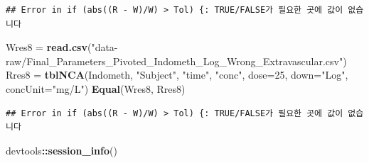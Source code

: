 \documentclass[12pt,]{krantz}
\newenvironment{Shaded}{\begin{snugshade}}{\end{snugshade}}
\newcommand{\DataTypeTok}[1]{\textcolor[rgb]{0.13,0.29,0.53}{#1}}
\newcommand{\DecValTok}[1]{\textcolor[rgb]{0.00,0.00,0.81}{#1}}
\newcommand{\KeywordTok}[1]{\textcolor[rgb]{0.13,0.29,0.53}{\textbf{#1}}}
\newcommand{\NormalTok}[1]{#1}
\newcommand{\OperatorTok}[1]{\textcolor[rgb]{0.81,0.36,0.00}{\textbf{#1}}}
\newcommand{\StringTok}[1]{\textcolor[rgb]{0.31,0.60,0.02}{#1}}
\begin{document}
\begin{verbatim}
## Error in if (abs((R - W)/W) > Tol) {: TRUE/FALSE가 필요한 곳에 값이 없습니다
\end{verbatim}

\begin{Shaded}
\begin{Highlighting}[]
\NormalTok{Wres8 =}\StringTok{ }\KeywordTok{read.csv}\NormalTok{(}\StringTok{"data-raw/Final_Parameters_Pivoted_Indometh_Log_Wrong_Extravascular.csv"}\NormalTok{)}
\NormalTok{Rres8 =}\StringTok{ }\KeywordTok{tblNCA}\NormalTok{(Indometh, }\StringTok{"Subject"}\NormalTok{, }\StringTok{"time"}\NormalTok{, }\StringTok{"conc"}\NormalTok{, }\DataTypeTok{dose=}\DecValTok{25}\NormalTok{, }\DataTypeTok{down=}\StringTok{"Log"}\NormalTok{, }
               \DataTypeTok{concUnit=}\StringTok{"mg/L"}\NormalTok{)}
\KeywordTok{Equal}\NormalTok{(Wres8, Rres8)}
\end{Highlighting}
\end{Shaded}

\begin{verbatim}
## Error in if (abs((R - W)/W) > Tol) {: TRUE/FALSE가 필요한 곳에 값이 없습니다
\end{verbatim}

\begin{Shaded}
\begin{Highlighting}[]
\NormalTok{devtools}\OperatorTok{::}\KeywordTok{session_info}\NormalTok{()}
\end{Highlighting}
\end{Shaded}
\end{document}
